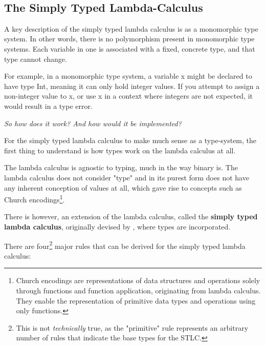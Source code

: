 \documentclass{l4proj}
\begin{document}
\

\subsection{The Simply Typed Lambda-Calculus}

A key description of the simply typed lambda calculus is as a monomorphic type system.
In other words, there is no polymorphism present in monomorphic type systems. 
Each variable in one is associated with a fixed, concrete type, and that type cannot change.

For example, in a monomorphic type system, a variable x might be declared to have type Int, meaning it can only hold integer values.
If you attempt to assign a non-integer value to x, or use x in a context where integers are not expected, it would result in a type error.



\emph{So how does it work? And how would it be implemented?}

For the simply typed lambda calculus to make much sense as a type-system, the first thing to understand is how types work on the lambda calculus at all.

The lambda calculus is agnostic to typing, much in the way binary is.
The lambda calculus does not consider "type" and in its purest form does not have any inherent conception of values at all, which gave rise to concepts such as Church encodings\footnote{Church encodings are representations of data structures and operations solely through functions and function application, originating from lambda calculus. They enable the representation of primitive data types and operations using only functions.}. 

There is however, an extension of the lambda calculus, called the \textbf{simply typed lambda calculus}, originally devised by \citet{Church_1940}, where types are incorporated.

There are four\footnote{This is not \emph{technically} true, as the "primitive" rule represents an arbitrary number of rules that indicate the base types for the STLC.} major rules that can be derived for the simply typed lambda calculus\citep{Stlc_upenn}:


\end{document}

